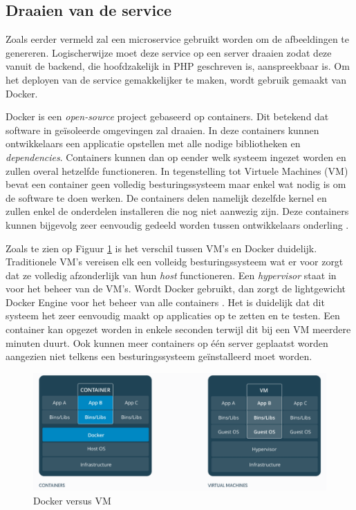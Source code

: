 \subsection{Draaien van de service}
Zoals eerder vermeld zal een microservice gebruikt worden om de afbeeldingen te genereren. Logischerwijze moet deze service op een server draaien zodat deze vanuit de backend, die hoofdzakelijk in PHP geschreven is, aanspreekbaar is. Om het deployen van de service gemakkelijker te maken, wordt gebruik gemaakt van Docker. 

Docker is een \textit{open-source} project gebaseerd op containers. Dit betekend dat software in ge\"{i}soleerde omgevingen zal draaien. In deze containers kunnen ontwikkelaars een applicatie opstellen met alle nodige bibliotheken en \textit{dependencies}. Containers kunnen dan op eender welk systeem ingezet worden en zullen overal hetzelfde functioneren. In tegenstelling tot Virtuele Machines (VM) bevat een container geen volledig besturingssysteem maar enkel wat nodig is om de software te doen werken. De containers delen namelijk dezelfde kernel en zullen enkel de onderdelen installeren die nog niet aanwezig zijn. Deze containers kunnen bijgevolg zeer eenvoudig gedeeld worden tussen ontwikkelaars onderling \cite{DockerWhatDocker}. 

Zoals te zien op Figuur \ref{fig:DockerDiagram} is het verschil tussen VM's en Docker duidelijk. Traditionele VM's vereisen elk een volleidg besturingssysteem wat er voor zorgt dat ze volledig afzonderlijk van hun \textit{host} functioneren. Een \textit{hypervisor} staat in voor het beheer van de VM's. Wordt Docker gebruikt, dan zorgt de lightgewicht Docker Engine voor het beheer van alle containers \cite{OpenSourceWhatDocker}. Het is duidelijk dat dit systeem het zeer eenvoudig maakt op applicaties op te zetten en te testen. Een container kan opgezet worden in enkele seconden terwijl dit bij een VM meerdere minuten duurt. Ook kunnen meer containers op \'{e}\'{e}n server geplaatst worden aangezien niet telkens een besturingssysteem ge\"{i}nstalleerd moet worden. 

\begin{figure}[H]
	\centering
	\includegraphics[width=1\textwidth]{Figuren/DockerDiagram.png}
	\caption{Docker versus VM \cite{DockerDiagram}}
	\label{fig:DockerDiagram}
\end{figure}

